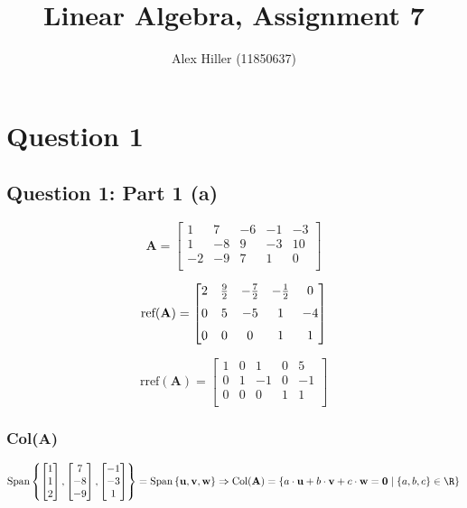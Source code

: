 \documentclass{article}
\author{Alex Hiller (11850637)}
\title{Linear Algebra, Assignment 7}
\begin{document}
\maketitle

\section{Question 1} 
\subsection{Question 1: Part 1 (a)} 
\[%
    \mathbf{A} 
    = 
    \begin{bmatrix} 
        1 & 7 & -6 & -1 & -3 \\
		1 & -8 & 9 & -3 & 10 \\
		-2 & -9 & 7 & 1 & 0\\		
    \end{bmatrix}
\]%

\[%
    \text{ref} (\mathbf{A}) 
    =
    \begin{bmatrix} \vspace{2mm}
        2 & \frac{9}{2}  & -\frac{7}{2}  & -\frac{1}{2}  & 0 \\ \vspace{2mm}
		0 & 5 & -5 & 1 & -4 \\
		0 & 0 & 0 & 1 & 1 \\		
    \end{bmatrix}
\]%

\[%
    \text{rref} (\mathbf{A}) 
    = 
    \begin{bmatrix} 
        1 & 0 & 1 & 0 & 5 \\
		0 & 1 & -1 & 0 & -1 \\
		0 & 0 & 0 & 1 & 1 \\		
    \end{bmatrix}
\]%

\subsubsection{Col(\textbf{A})} 

\[%
    \text{Span} \left\{
    \begin{bmatrix} 1\\1\\2\\ \end{bmatrix},
    \begin{bmatrix} 7\\-8\\-9\\ \end{bmatrix},
    \begin{bmatrix} -1\\-3\\1\\ \end{bmatrix}
    \right\}
    =
    \text{Span} \left\{ 
    \mathbf{u},\mathbf{v},\mathbf{w}\right\}
    \Rightarrow 
    \text{Col}(\mathbf{A}) = 
    \left\{  
    a \cdot \mathbf{u} +
    b \cdot \mathbf{v} +
    c \cdot \mathbf{w} 
    =
    \mathbf{0}
    \mid
    \left\{ a,b,c \right\} \in \R
    \right\}
\]%
\end{document}
